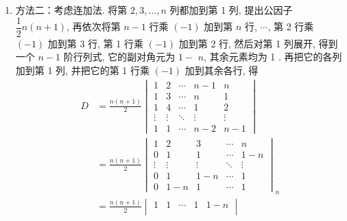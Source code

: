 \documentclass[12pt,fontset=fandol]{ctexart}
\begin{document}
\begin{solve}
\begin{enumerate}
\begin{enumerate}
                          \item 方法二：考虑连加法. 将第 $2,3, \ldots, n$ 列都加到第 1 列, 提出公因子 $\dfrac{1}{2} n(n+1)$, 再依次将第 $n-1$ 行乘 $(-1)$ 加到第 $n$ 行, $\cdots$, 第 2 行乘 $(-1)$ 加到第 3 行, 第 1 行乘 $(-1)$ 加到第 2 行, 然后对第 1 列展开, 得到一个 $n-1$ 阶行列式, 它的副对角元为 $1-$ $n$, 其余元素均为 1 . 再把它的各列加到第 1 列, 并把它的第 1 行乘 $(-1)$ 加到其余各行, 得
                                \begin{align*}
                                    D & =\frac{n(n+1)}{2}\begin{vmatrix}
                                                             1      & 2      & \cdots & n-1    & n      \\
                                                             1      & 3      & \cdots & n      & 1      \\
                                                             1      & 4      & \cdots & 1      & 2      \\
                                                             \vdots & \vdots & \ddots & \vdots & \vdots \\
                                                             1      & 1      & \cdots & n-2    & n-1
                                                         \end{vmatrix} \\
                                      & =\frac{n(n+1)}{2}\begin{vmatrix}
                                                             1      & 2      & 3      & \cdots & n      \\
                                                             0      & 1      & 1      & \cdots & 1-n    \\
                                                             \vdots & \vdots & \vdots & \ddots & \vdots \\
                                                             0      & 1      & 1-n    & \cdots & 1      \\
                                                             0      & 1-n    & 1      & \cdots & 1
                                                         \end{vmatrix}_{n} \\
                                      & =\frac{n(n+1)}{2}
                                    \begin{vmatrix}
                                        1      & 1      & \cdots & 1      & 1-n \\

\end{vmatrix}
\end{align*}
\end{enumerate}
\end{enumerate}
\end{solve}
\end{document}
